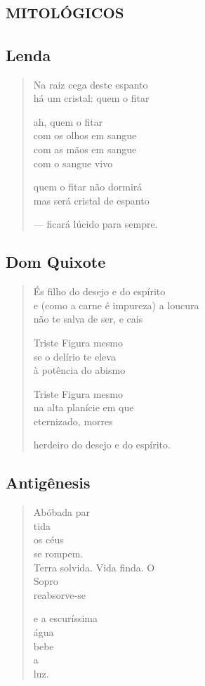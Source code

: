 \part*{\textsc{mitológicos}}

\chapter{Lenda}

\begin{verse}
Na raiz cega deste espanto\\
há um cristal: quem o fitar

ah, quem o fitar\\
com os olhos em sangue\\
com as mãos em sangue\\
com o sangue vivo

quem o fitar não dormirá\\
mas será cristal de espanto

--- ficará lúcido para sempre.
\end{verse}

\chapter{Dom Quixote}

\begin{verse}
És filho do desejo e do espírito\\
e (como a carne é impureza) a loucura\\
não te salva de ser, e cais

Triste Figura mesmo\\
se o delírio te eleva\\
à potência do abismo

Triste Figura mesmo\\
na alta planície em que\\
eternizado, morres

herdeiro do desejo e do espírito.
\end{verse}

\chapter{Antigênesis}

\begin{verse}
Abóbada par\\
tida\\
os céus\\
se rompem.\\
Terra solvida. Vida finda. O\\
Sopro\\
reabsorve-se

e a escuríssima\\
água\\
bebe\\
a\\
luz.
\end{verse}

